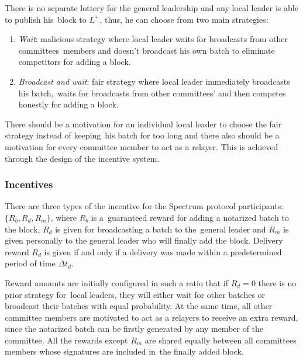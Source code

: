 There is no separate lottery for the general leadership and any local leader is able to publish his\
block to $L^+$, thus, he can choose from two main strategies:
\begin{enumerate}
    \item \emph{Wait}: malicious strategy where local leader waits for broadcasts from other committees\
    members and doesn't broadcast his own batch to eliminate competitors for adding a block.
    \item \emph{Broadcast and wait}: fair strategy where local leader immediately broadcasts his batch,\
    waits for broadcasts from other committees' and then competes honestly for adding a block.
\end{enumerate}
There should be a motivation for an individual local leader to choose the fair strategy instead of keeping\
his batch for too long and there also should be a motivation for every committee member to act as a relayer.
This is achieved through the design of the incentive system.

\subsubsection{Incentives}

There are three types of the incentive for the Spectrum protocol participants: ${\{R_b, R_d, R_m\}}$, where $R_b$ is a\
guaranteed reward for adding a notarized batch to the block, $R_d$ is given for broadcasting a batch to the\
general leader and $R_m$ is given personally to the general leader who will finally add the block.
Delivery reward $R_d$ is given if and only if a delivery was made within a predetermined period of time $\Delta t_d$.

Reward amounts are initially configured in such a ratio that if ${R_d=0}$ there is no prior strategy for\
local leaders, they will either wait for other batches or broadcast their batches with equal probability.
At the same time, all other committee members are motivated to act as a relayers to receive an extra reward,
since the notarized batch can be firstly generated by any member of the committee.
All the rewards except $R_m$ are shared equally between all committees members whose signatures are included in\
the finally added block.

